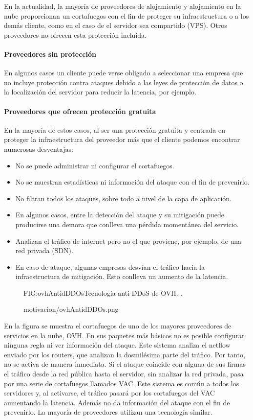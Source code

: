 En la actualidad, la mayoría de proveedores de alojamiento y alojamiento en la nube proporcionan un cortafuegos con el fin de proteger su infraestructura o a los demás cliente, como en el caso de el servidor sea compartido (VPS). Otros proveedores no ofrecen esta protección incluida.

\paragraph{Proveedores sin protección}
En algunos casos un cliente puede verse obligado a seleccionar una empresa que no incluye protección contra ataques debido a las leyes de protección de datos o la localización del servidor para reducir la latencia, por ejemplo.

\paragraph{Proveedores que ofrecen protección gratuita}
En la mayoría de estos casos, al ser una protección gratuita y centrada en proteger la infraestructura del proveedor más que el cliente podemos encontrar numerosas desventajas:
\begin{itemize}
\item No se puede administrar ni configurar el cortafuegos.
\item No se muestran estadísticas ni información del ataque con el fin de prevenirlo.
\item No filtran todos los ataques, sobre todo a nivel de la capa de aplicación.
\item En algunos casos, entre la detección del ataque y su mitigación puede producirse una demora que conlleva una pérdida momentánea del servicio.
\item Analizan el tráfico de internet pero no el que proviene, por ejemplo, de una red privada (SDN).
\item En caso de ataque, algunas empresas desvían el tráfico hacia la infraestructura de mitigación. Esto conlleva un aumento de la latencia.
\end{itemize}
\begin{figure}[Tecnología anti-DDoS de OVH.]{FIG:ovhAntidDDOs}{Tecnología anti-DDoS de OVH. \cite{ovhAntidDDOs}.}
  \begin{image}{}{}{motivacion/ovhAntidDDOs.png}
  \end{image}
\end{figure}
En la figura se muestra el cortafuegos de uno de los mayores proveedores de servicios en la nube, OVH. En sus paquetes más básicos no es posible configurar ninguna regla ni ver información del ataque. Este sistema analiza el netflow enviado por los routers, que analizan la dosmilésima parte del tráfico. Por tanto, no se activa de manera inmediata. Si el ataque coincide con alguna de sus firmas el tráfico desde la red pública hasta el servidor, sin analizar la red privada, pasa por una serie de cortafuegos llamados VAC. Este sistema es común a todos los servidores y, al activarse, el tráfico pasará por los cortafuegos del VAC aumentando la latencia. Además no da información del ataque con el fin de prevenirlo. La mayoría de proveedores utilizan una tecnología similar.
